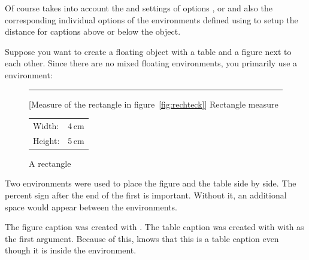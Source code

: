 Of course takes into account the  and 
settings of options ,
 or
 and also the corresponding individual
options of the environments defined using
 to setup the distance for captions
above or below the object.
\begin{Example}
  Suppose you want to create a floating object with a table and a figure next
  to each other. Since there are no mixed floating environments, you primarily
  use a  environment:
\begin{lstcode}
  \begin{figure}
    \begin{minipage}{.5\linewidth}
      \centering
      \rule{4cm}{5cm}
      \caption{A rectangle}\label{fig:rechteck}
    \end{minipage}%
    \begin{minipage}{.5\linewidth}
      \centering
      [Measure of the rectangle in
        figure~\ref{fig:rechteck}]%
      {Rectangle measure}
      \label{tab:rechteck}
      \begin{tabular}{ll}
        Width:  & 4\,cm\\
        Height: & 5\,cm
      \end{tabular}
    \end{minipage}
  \end{figure}
\end{lstcode}
  Two  environments were used to place the figure
  and the table side by side. The percent sign after the
  end of the first  is important. Without it, an
  additional space would appear between the 
  environments.

  The figure caption was created with . The
  table caption was created with  with  as
  the first argument. Because of this,  knows that this is a
  table caption even though it is inside the  environment.


\end{Example}
